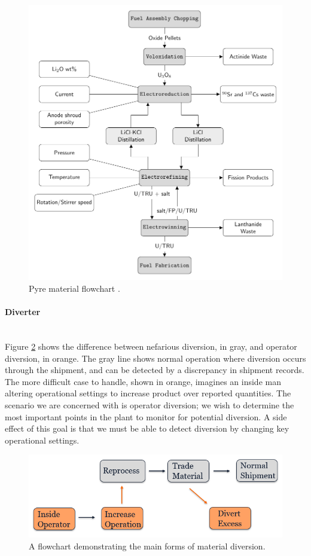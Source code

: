 \begin{figure}[h]
	\centering
	\includegraphics[width=0.9\linewidth]{images/flowchart}
	\caption{Pyre material flowchart \cite{borrelli_approaches_2017}.}
	\label{fig:flowchart}
\end{figure}

\paragraph{Diverter} \mbox{}\\
Figure \ref{fig:diverttype} shows the difference between nefarious diversion, in gray, and operator diversion, in orange. The gray line shows normal operation where diversion occurs
through the shipment, and can be detected by a discrepancy in shipment records. The more difficult case to handle, shown in orange, imagines an inside man altering operational settings
to increase product over reported quantities. The scenario we are concerned with is operator diversion; we wish to determine the most important points in the plant to monitor for potential
diversion. A side effect of this goal is that we must be able to detect diversion by changing key operational settings.

\begin{figure}[h]
	\centering
	\includegraphics[width=0.8\linewidth]{images/westphal-diversion}
	\caption{A flowchart demonstrating the main forms of material diversion.}
	\label{fig:diverttype}
\end{figure}

